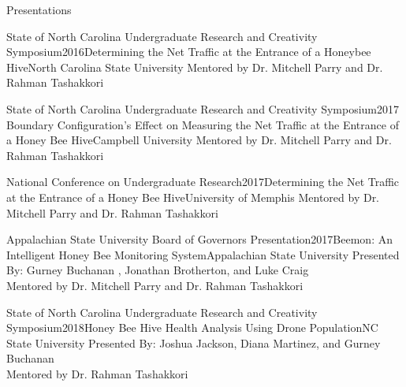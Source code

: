 \documentclass{resume} %
\begin{document}
\begin{rSection}{Presentations}
\begin{rSubsection}{State of North Carolina Undergraduate Research and Creativity Symposium}{2016}{Determining the Net Traffic at the Entrance of a Honeybee Hive}{North Carolina State University}
    Mentored by Dr. Mitchell Parry and Dr. Rahman Tashakkori 
\end{rSubsection}
\begin{rSubsection}{State of North Carolina Undergraduate Research and Creativity Symposium}{2017}{    Boundary Configuration's Effect on Measuring the Net Traffic at the Entrance of a Honey Bee Hive}{Campbell University}{}
    Mentored by Dr. Mitchell Parry and Dr. Rahman Tashakkori 
\end{rSubsection}
\begin{rSubsection}{National Conference on Undergraduate Research}{2017}{Determining the Net Traffic at the Entrance of a Honey Bee Hive}{University of Memphis}{}
    Mentored by Dr. Mitchell Parry and Dr. Rahman Tashakkori 
\end{rSubsection}
\begin{rSubsection}{Appalachian State University Board of Governors Presentation}{2017}{Beemon: An Intelligent Honey Bee Monitoring System}{Appalachian State University}{}
    Presented By: Gurney Buchanan , Jonathan Brotherton, and Luke Craig\\
    Mentored by Dr. Mitchell Parry and Dr. Rahman Tashakkori 
\end{rSubsection}
\begin{rSubsection}{State of North Carolina Undergraduate Research and Creativity Symposium}{2018}{Honey Bee Hive Health Analysis Using Drone Population}{NC State University}{}
    Presented By: Joshua Jackson, Diana Martinez, and Gurney Buchanan\\
    Mentored by Dr. Rahman Tashakkori 
\end{rSubsection}
\end{rSection}
\end{document}
